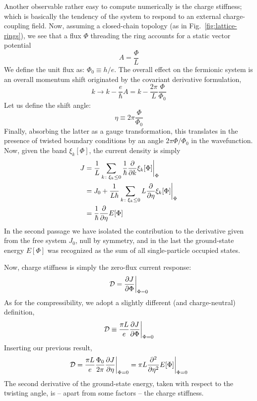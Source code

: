 Another observable rather easy to compute numerically is the charge stiffness; which is basically the tendency of the system to respond to an external charge-coupling field. Now, assuming a closed-chain topology (as in Fig.~\ref{fig:lattice-rings}), we see that a flux $\Phi$ threading the ring accounts for a static vector potential
\[
	A = \frac{\Phi}{L}
\]
We define the unit flux as:	$\Phi_0 \equiv h/e$. The overall effect on the fermionic system is an overall momentum shift originated by the covariant derivative formulation,
\[
	k \to k - \frac{e}{\hbar} A = k - \frac{2\pi}{L} \frac{\Phi}{\Phi_0}
\]
Let us define the shift angle:
\[
	\eta \equiv 2\pi \frac{\Phi}{\Phi_0}
\]
Finally, absorbing the latter as a gauge transformation, this translates in the presence of twisted boundary conditions by an angle $2\pi \Phi/\Phi_0$ in the wavefunction. Now, given the band $\xi_k[\Phi]$, the current density is simply
\[
	\begin{aligned}
		J &= \frac{1}{L} \sum_{k \colon \xi_k \le 0} \frac{1}{\hbar} \pdv{}{k} \xi_k[\Phi] \bigg|_\Phi \\
		&= J_0 +  \frac{1}{L\hbar} \sum_{k \colon \xi_k \le 0} L \pdv{}{\eta} \xi_k[\Phi] \bigg|_\Phi \\
		&= \frac{1}{\hbar} \pdv{\eta} E[\Phi]
	\end{aligned}
\]
In the second passage we have isolated the contribution to the derivative given from the free system $J_0$, null by symmetry, and in the last the ground-state energy $E[\Phi]$ was recognized as the sum of all single-particle occupied states.

Now, charge stiffness is simply the zero-flux current response:
\[
	\mathcal{D} = \pdv{J}{\Phi} \bigg|_{\Phi=0}
\]
As for the compressibility, we adopt a slightly different (and charge-neutral) definition,
\begin{equation}\label{eq:charge-stiffness-definition}
	\mathcal{D} \equiv \frac{\pi L}{e} \pdv{J}{\Phi} \bigg|_{\Phi=0}
\end{equation}
Inserting our previous result,
\[
	\mathcal{D} = \frac{\pi L}{e} \frac{\Phi_0}{2\pi} \pdv{J}{\eta} \bigg|_{\Phi=0} = \pi L \pdv[2]{\eta} E[\Phi] \bigg|_{\Phi=0}
\]
The second derivative of the ground-state energy, taken with respect to the twisting angle, is -- apart from some factors -- the charge stiffness.

